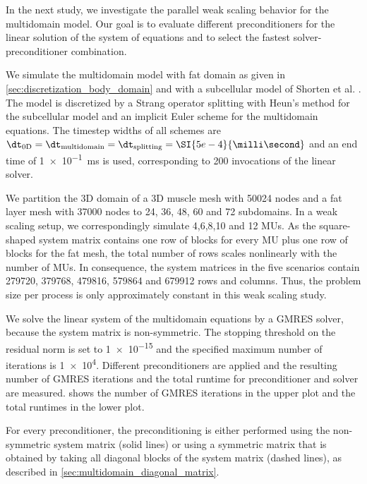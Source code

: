 In the next study, we investigate the parallel weak scaling behavior for the multidomain model.
Our goal is to evaluate different preconditioners for the linear solution of the system of equations and to select the fastest solver-preconditioner combination.

We simulate the multidomain model with fat domain as given in \cref{sec:discretization_body_domain} and with a subcellular model of Shorten et al. \cite{Shorten2007}. 
The model is discretized by a Strang operator splitting with Heun's method for the subcellular model and an implicit Euler scheme for the multidomain equations. The timestep widths of all schemes are $\dt_\text{0D}=\dt_\text{multidomain}=\dt_\text{splitting}=\SI{5e-4}{\milli\second}$ and an end time of \SI{1e-1}{\milli\second} is used, corresponding to 200 invocations of the linear solver.

We partition the 3D domain of a 3D muscle mesh with \num{50024} nodes and a fat layer mesh with \num{37000} nodes to 24, 36, 48, 60 and 72 subdomains. In a weak scaling setup, we correspondingly simulate 4,6,8,10 and 12 MUs.
As the square-shaped system matrix contains one row of blocks for every MU plus one row of blocks for the fat mesh, the total number of rows scales nonlinearly with the number of MUs. In consequence, the system matrices in the five scenarios contain \num{279720}, \num{379768}, \num{479816}, \num{579864} and \num{679912} rows and columns. Thus, the problem size per process is only approximately constant in this weak scaling study.


We solve the linear system of the multidomain equations by a GMRES solver, because the system matrix is non-symmetric.
The stopping threshold on the residual norm is set to \num{1e-15} and the specified maximum number of iterations is \num{1e4}. 
Different preconditioners are applied and the resulting number of GMRES iterations and the total runtime for preconditioner and solver are measured.
 shows the number of GMRES iterations in the upper plot and the total runtimes in the lower plot.

For every preconditioner, the preconditioning is either performed using the non-symmetric system matrix (solid lines) or using a symmetric matrix that is obtained by taking all diagonal blocks of the system matrix (dashed lines), as described in \cref{sec:multidomain_diagonal_matrix}.

